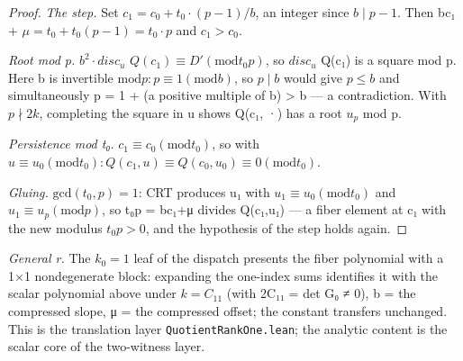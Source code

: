\begin{proof}
\emph{The step.} Set $c_{1} = c_{0} + t_{0}·(p−1)/b$, an integer since $b ∣ p−1$. Then bc₁ + $μ = t_{0} + t_{0}(p−1) = t_{0}·p$ and $c_{1} > c_{0}$.

\emph{Root mod p.} $b^{2}·disc_{u}$ $Q(c_{1}) ≡ D′ (\mathrm{mod} t_{0}p)$, so $disc_{u}$ Q(c₁) is a square mod p. Here b is invertible $\mathrm{mod} p: p ≡ 1 (\mathrm{mod} b)$, so $p ∣ b$ would give $p ≤ b$ and simultaneously p = 1 + (a positive multiple of b) > b — a contradiction. With $p ∤ 2k$, completing the square in u shows Q(c₁, ·) has a root $u_{p}$ mod p.

\emph{Persistence mod t₀.} $c_{1} ≡ c_{0} (\mathrm{mod} t_{0})$, so with $u ≡ u_{0} (\mathrm{mod} t_{0}): Q(c_{1},u) ≡ Q(c_{0},u_{0}) ≡ 0 (\mathrm{mod} t_{0})$.

\emph{Gluing.} $\mathrm{gcd}(t_{0},p) = 1$: CRT produces u₁ with $u_{1} ≡ u_{0} (\mathrm{mod} t_{0})$ and $u_{1} ≡ u_{p} (\mathrm{mod} p)$, so t₀p = bc₁+μ divides Q(c₁,u₁) — a fiber element at c₁ with the new modulus $t_{0}p > 0$, and the hypothesis of the step holds again.

\end{proof}
\emph{General r.} The $k_{0} = 1$ leaf of the dispatch presents the fiber polynomial with a 1×1 nondegenerate block: expanding the one-index sums identifies it with the scalar polynomial above under $k = C_{11}$ (with 2C₁₁ = det G₀ ≠ 0), b = the compressed slope, μ = the compressed offset; the constant transfers unchanged. This is the translation layer \texttt{QuotientRankOne.\allowbreak{}lean}; the analytic content is the scalar core of the two-witness layer.

